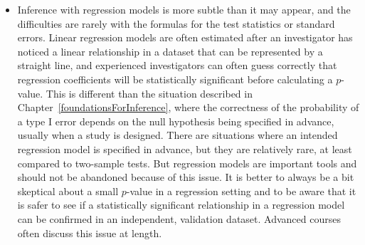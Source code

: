 \begin{itemize}
   \item Inference with regression models is more subtle than it may appear, and the difficulties are rarely with the formulas for the test statistics or standard errors.  Linear regression models are often estimated after an investigator has noticed a linear relationship in a dataset that can be represented by a straight line, and experienced investigators can often guess correctly that regression coefficients will be statistically significant before calculating a $p$-value.  This is different than the situation described in Chapter~\ref{foundationsForInference}, where the correctness of the probability of a type I error depends on the null hypothesis being specified in advance, usually when a study is designed.  There are situations where an intended regression model is specified in advance, but they are relatively rare, at least compared to two-sample tests.  But regression models are important tools and should not be abandoned because of this issue.  It is better to always be a bit skeptical about a small $p$-value in a regression setting and to be aware that it is safer to see if a statistically significant relationship in a regression model can be confirmed in an independent, validation dataset.  Advanced courses often discuss this issue at length.

  \end{itemize}

